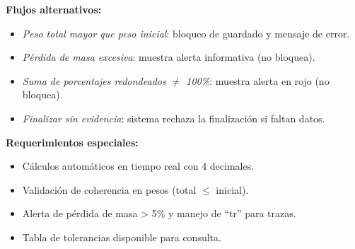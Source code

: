 \vspace{0.5em}
\noindent\textbf{Flujos alternativos:}
\begin{itemize}[nosep]
    \item \textit{Peso total mayor que peso inicial}: bloqueo de guardado y mensaje de error.
    \item \textit{Pérdida de masa excesiva}: muestra alerta informativa (no bloquea).
    \item \textit{Suma de porcentajes redondeados $\neq$ 100\%}: muestra alerta en rojo (no bloquea).
    \item \textit{Finalizar sin evidencia}: sistema rechaza la finalización si faltan datos.
\end{itemize}

\vspace{0.5em}
\noindent\textbf{Requerimientos especiales:}
\begin{itemize}[nosep]
    \item Cálculos automáticos en tiempo real con 4 decimales.
    \item Validación de coherencia en pesos (total $\leq$ inicial).
    \item Alerta de pérdida de masa > 5\% y manejo de ``tr'' para trazas.
    \item Tabla de tolerancias disponible para consulta.
\end{itemize}
